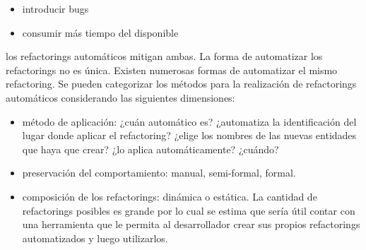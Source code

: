 \begin{itemize}
    \item introducir bugs
    \item consumir más tiempo del disponible
\end{itemize}

los refactorings automáticos mitigan ambas. La forma de automatizar los refactorings no es única. Existen
numerosas formas de automatizar el mismo refactoring. Se pueden categorizar los métodos para la realización
de refactorings automáticos considerando las siguientes dimensiones:

\begin{itemize}
    \item método de aplicación: ¿cuán automático es? ¿automatiza la identificación del lugar donde
    aplicar el refactoring? ¿elige los nombres de las nuevas entidades que haya que crear? ¿lo
    aplica automáticamente? ¿cuándo?
    \item preservación del comportamiento: manual, semi-formal, formal.
    \item composición de los refactorings: dinámica o estática. La cantidad de refactorings posibles
es grande por lo cual se estima que sería útil contar con una herramienta que le permita al
desarrollador crear sus propios refactorings automatizados y luego utilizarlos.
\end{itemize}



